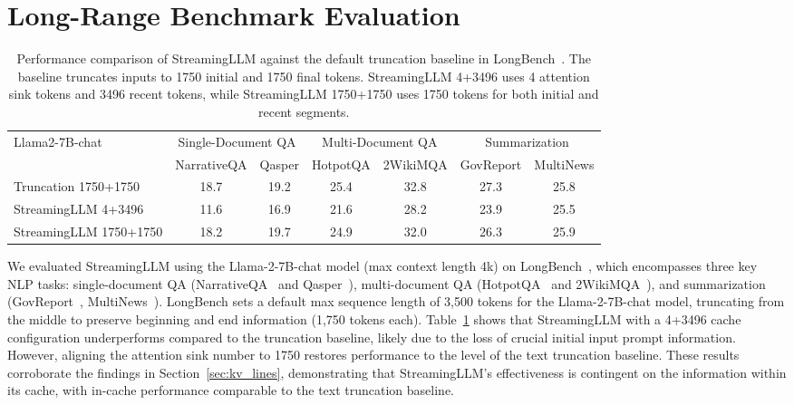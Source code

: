 \documentclass{article} \usepackage{iclr2024_conference,times}
\def\method{StreamingLLM\xspace}
\begin{document}
\section{Long-Range Benchmark Evaluation}
\begin{table}
    \centering
    \small
    \setlength{\tabcolsep}{3pt}
    \caption{\small Performance comparison of \method against the default truncation baseline in LongBench~\citep{bai2023longbench}. The baseline truncates inputs to 1750 initial and 1750 final tokens. \method 4+3496 uses 4 attention sink tokens and 3496 recent tokens, while \method 1750+1750 uses 1750 tokens for both initial and recent segments.}
    \label{tab:longbench}
    \begin{tabular}{lcccccc}
        \toprule
        \multirow{2}{*}{Llama2-7B-chat} & \multicolumn{2}{c}{Single-Document QA} & \multicolumn{2}{c}{Multi-Document QA} & \multicolumn{2}{c}{Summarization}                                    \\

                                        & NarrativeQA                            & Qasper                                & HotpotQA                          & 2WikiMQA & GovReport & MultiNews \\
        \midrule
        Truncation 1750+1750             & 18.7                                   & 19.2                                  & 25.4                              & 32.8     & 27.3      & 25.8      \\
        \midrule
        \method 4+3496                  & 11.6                                   & 16.9                                  & 21.6                              & 28.2     & 23.9      & 25.5      \\
        \method 1750+1750               & 18.2                                   & 19.7                                  & 24.9                              & 32.0     & 26.3      & 25.9      \\
        \bottomrule
    \end{tabular}
\end{table}
 We evaluated \method using the Llama-2-7B-chat model (max context length 4k) on LongBench~\citep{bai2023longbench}, which encompasses three key NLP tasks: single-document QA (NarrativeQA~\citep{narrativeqa} and Qasper~\citep{dasigi2021qasper}), multi-document QA (HotpotQA~\citep{yang2018hotpotqa} and 2WikiMQA~\cite{ho-etal-2020-constructing}), and summarization (GovReport~\citep{huang2021govreport}, MultiNews~\citep{fabbri2019multinews}). LongBench sets a default max sequence length of 3,500 tokens for the Llama-2-7B-chat model, truncating from the middle to preserve beginning and end information (1,750 tokens each). Table~\ref{tab:longbench} shows that \method with a 4+3496 cache configuration underperforms compared to the truncation baseline, likely due to the loss of crucial initial input prompt information. However, aligning the attention sink number to 1750 restores performance to the level of the text truncation baseline. These results corroborate the findings in Section~\ref{sec:kv_lines}, demonstrating that \method's effectiveness is contingent on the information within its cache, with in-cache performance comparable to the text truncation baseline.
\end{document}
